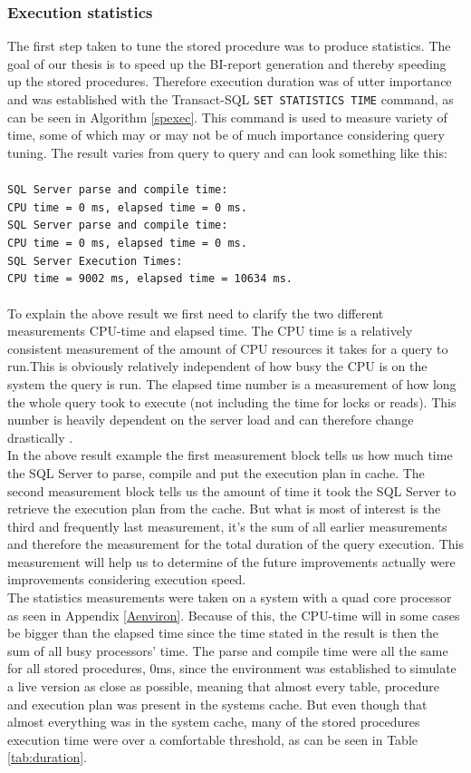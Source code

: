 \documentclass{cslthse-msc}
\begin{document}
\subsubsection{Execution statistics}
The first step taken to tune the stored procedure was to produce statistics. The goal of our thesis is to speed up the BI-report generation and thereby speeding up the stored procedures. Therefore execution duration was of utter importance and was established with the Transact-SQL \texttt{SET STATISTICS TIME} command, as can be seen in Algorithm \ref{spexec}. This command is used to measure variety of time, some of which may or may not be of much importance considering query tuning. The result varies from query to query and can look something like this: \\\\\texttt{SQL Server parse and compile time:\\
CPU time = 0 ms, elapsed time = 0 ms.\\
SQL Server parse and compile time:\\
CPU time = 0 ms,  elapsed time = 0 ms.\\
SQL Server Execution Times:\\
CPU time = 9002 ms,  elapsed time = 10634 ms.
}\\\\
To explain the above result we first need to clarify the two different measurements CPU-time and elapsed time. The CPU time is a relatively consistent measurement of the amount of CPU resources it takes for a query to run.This is obviously relatively independent of how busy the CPU is on the system the query is run. The elapsed time number is a measurement of how long the whole query took to execute (not including the time for locks or reads). This number is heavily dependent on the server load and can therefore change drastically    \cite{statistics}. \\ In the above result example the first measurement block tells us how much time the SQL Server to parse, compile and put the execution plan in cache. The second measurement block tells us the amount of time it took the SQL Server to retrieve the execution plan from the cache. But what is most of interest is the third and frequently last measurement, it's the sum of all earlier measurements and therefore the measurement for the total duration of the query execution. This measurement will help us to determine of the future improvements actually were improvements considering execution speed.\\
The statistics measurements were taken on a system with a quad core processor as seen in Appendix \ref{Aenviron}. Because of this, the CPU-time will in some cases be bigger than the elapsed time since the time stated in the result is then the sum of all busy processors' time. The parse and compile time were all the same for all stored procedures, 0ms, since the environment was established to simulate a live version as close as possible, meaning that almost every table, procedure and execution plan was present in the systems cache. But even though that almost everything was in the system cache, many of the stored procedures execution time were over a comfortable threshold, as can be seen in Table \ref{tab:duration}. 
\end{document}
